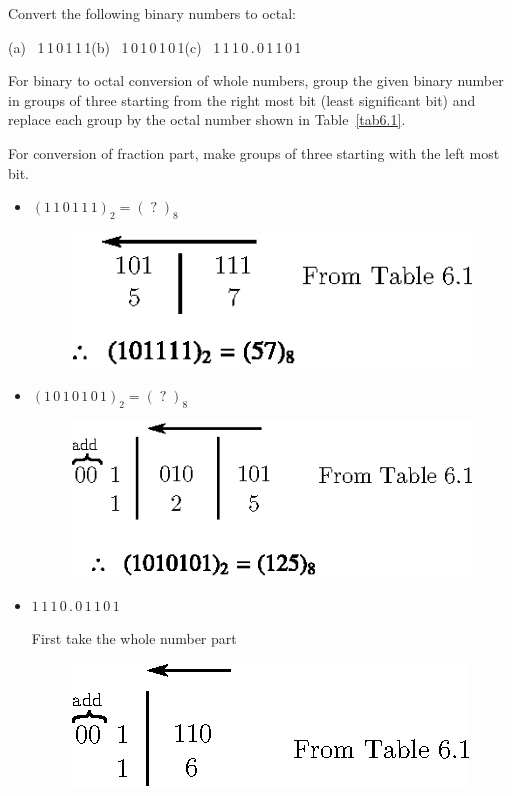 \begin{example}\label{exam6.7}
Convert the following binary numbers to octal:
\begin{center}
(a)~ 1\,1\,0\,1\,1\,1\qquad (b)~ 1\,0\,1\,0\,1\,0\,1\qquad (c)~ 1\,1\,1\,0\,.\,0\,1\,1\,0\,1
\end{center}
\end{example}

\begin{solution}
For binary to octal conversion of whole numbers, group the given binary number in groups of three starting from the right most bit (least significant bit) and replace each group by the octal number shown in Table~\ref{tab6.1}.

\eject

For conversion of fraction part, make groups of three starting with the left most bit.
\begin{itemize}
\item[(a)] $(1\,1\,0\,1\,1\,1)_{2}=(\;?\;)_{8}$
\begin{figure}[H]
\centering
\includegraphics[scale=1.1]{chap6/fig13.eps}
\end{figure}

\item[(b)] $(1\,0\,1\,0\,1\,0\,1)_{2}=(\;?\;)_{8}$
\begin{figure}[H]
\centering
\includegraphics[scale=1.1]{chap6/fig14.eps}
\end{figure}

\item[(c)] $1\,1\,1\,0\,.\,0\,1\,1\,0\,1$

First take the whole number part
\begin{figure}[H]
\centering
\includegraphics[scale=1.1]{chap6/fig15.eps}
\end{figure}


\end{itemize}
\end{solution}
